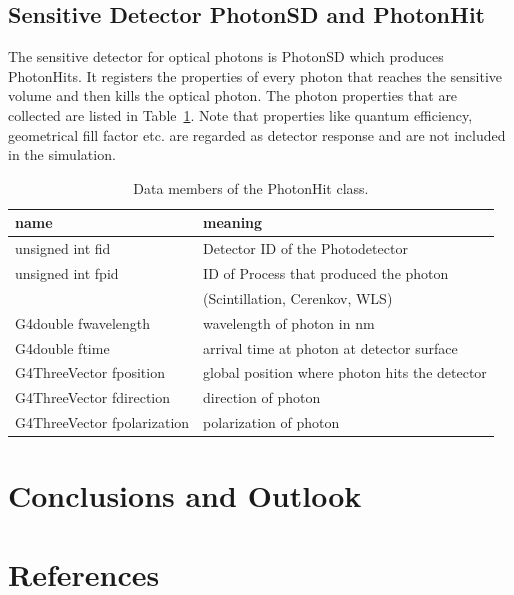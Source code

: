 \documentclass{article}
\begin{document}
\clearpage
\subsection{Sensitive Detector PhotonSD and PhotonHit}
The sensitive detector for optical photons is PhotonSD which produces PhotonHits. It registers the properties of every photon that reaches the sensitive volume and then kills the optical photon.
The photon properties that are collected are listed in Table~\ref{tab:table5}. Note that properties like quantum efficiency, geometrical fill factor etc. are regarded as detector response and are not
included in the simulation. 
 \begin{table}[h!]
  \begin{center}
    \label{tab:table5}
    \begin{tabular}{|l|l|} 
      \hline
      \textbf{ name } & \textbf{meaning } \\
      \hline
      unsigned int fid  & Detector ID of the Photodetector\\
      unsigned int fpid & ID of Process that produced the photon\\
                        & (Scintillation, Cerenkov, WLS)\\
      G4double fwavelength & wavelength of photon in nm\\
      G4double ftime & arrival time at photon at detector surface\\
      G4ThreeVector fposition & global position where photon hits the detector\\
      G4ThreeVector fdirection & direction of photon\\
      G4ThreeVector fpolarization & polarization of photon\\
      \hline
    \end{tabular}
  \end{center}
  \caption{Data members of the PhotonHit class.}
 \end{table}

 
\section{Conclusions and Outlook}
\clearpage
 \section*{References}
\end{document}
